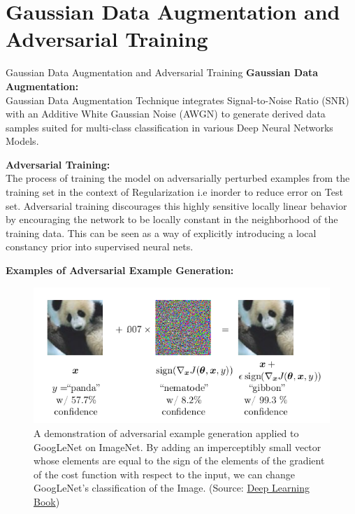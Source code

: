 \documentclass[8pt]{beamer}
\begin{document}
\section{Gaussian Data Augmentation and Adversarial Training}
\begin{frame}[allowframebreaks]{Gaussian Data Augmentation and Adversarial Training}
\textbf{Gaussian Data Augmentation:}\\
\qquad Gaussian Data Augmentation Technique integrates Signal-to-Noise Ratio (SNR) with an Additive White Gaussian Noise (AWGN) to generate derived data samples suited for multi-class classification in various Deep Neural Networks Models. 

\vspace{0.2in}

\textbf{Adversarial Training:}\\
\qquad The process of training the model on adversarially perturbed examples from the training set in the context of Regularization i.e inorder to reduce error on Test set. Adversarial training discourages this highly sensitive locally linear behavior by encouraging the network to be locally constant in the neighborhood of the training data. This can be seen as a way of explicitly introducing a local constancy prior into supervised neural nets.

\framebreak

\textbf{Examples of Adversarial Example Generation:}\\
\begin{figure}
    \centering
    \includegraphics[scale=0.4]{../Images/Adversarial Training.png}
    \caption{A demonstration of adversarial example generation applied to GoogLeNet on ImageNet. By adding an imperceptibly small vector whose elements are equal to the sign of the elements of the gradient of the cost function with respect to the input, we can change GoogLeNet’s classification of the Image. (Source: \href{https://www.deeplearningbook.org/}{Deep Learning Book})}
    \label{fig:my_label}
\end{figure}
\end{frame}
\end{document}
